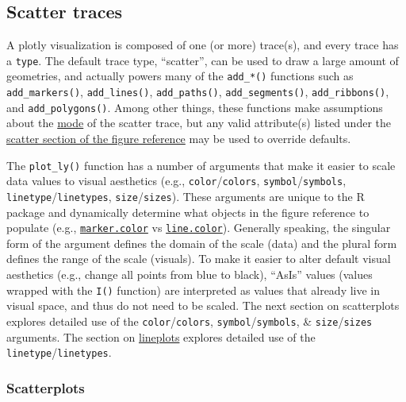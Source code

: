 \documentclass[12pt,]{isuthesis}
\begin{document}
\hypertarget{scatter-traces}{\subsection{Scatter
traces}\label{scatter-traces}}

A plotly visualization is composed of one (or more) trace(s), and every
trace has a \texttt{type}. The default trace type, ``scatter'', can be
used to draw a large amount of geometries, and actually powers many of
the \texttt{add\_*()} functions such as \texttt{add\_markers()},
\texttt{add\_lines()}, \texttt{add\_paths()}, \texttt{add\_segments()},
\texttt{add\_ribbons()}, and \texttt{add\_polygons()}. Among other
things, these functions make assumptions about the
\href{https://plot.ly/r/reference/\#scatter-mode}{mode} of the scatter
trace, but any valid attribute(s) listed under the
\href{https://plot.ly/r/reference/\#scatter}{scatter section of the
figure reference} may be used to override defaults.

The \texttt{plot\_ly()} function has a number of arguments that make it
easier to scale data values to visual aesthetics (e.g.,
\texttt{color}/\texttt{colors}, \texttt{symbol}/\texttt{symbols},
\texttt{linetype}/\texttt{linetypes}, \texttt{size}/\texttt{sizes}).
These arguments are unique to the R package and dynamically determine
what objects in the figure reference to populate (e.g.,
\href{https://plot.ly/r/reference/\#scatter-marker-color}{\texttt{marker.color}}
vs \href{https://plot.ly/r/reference/\#scatter}{\texttt{line.color}}).
Generally speaking, the singular form of the argument defines the domain
of the scale (data) and the plural form defines the range of the scale
(visuals). To make it easier to alter default visual aesthetics (e.g.,
change all points from blue to black), ``AsIs'' values (values wrapped
with the \texttt{I()} function) are interpreted as values that already
live in visual space, and thus do not need to be scaled. The next
section on scatterplots explores detailed use of the
\texttt{color}/\texttt{colors}, \texttt{symbol}/\texttt{symbols}, \&
\texttt{size}/\texttt{sizes} arguments. The section on
\protect\hyperlink{line-plots}{lineplots} explores detailed use of the
\texttt{linetype}/\texttt{linetypes}.

\hypertarget{scatterplots}{\subsubsection{Scatterplots}\label{scatterplots}}
\end{document}

